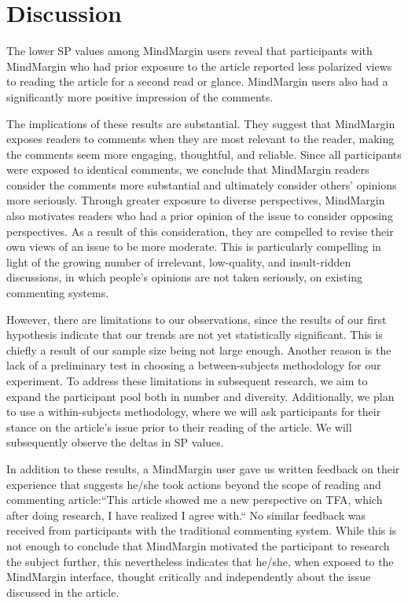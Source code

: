 \section{Discussion}

The lower SP values among MindMargin users reveal that participants with MindMargin who had prior exposure to the article reported less polarized views to reading the article for a second read or glance. MindMargin users also had a significantly more positive impression of the comments. 

The implications of these results are substantial. They suggest that MindMargin exposes readers to comments when they are most relevant to the reader, making the comments seem more engaging, thoughtful, and reliable. Since all participants were exposed to identical comments, we conclude that MindMargin readers consider the comments more substantial and ultimately consider others' opinions more seriously. Through greater exposure to diverse perspectives, MindMargin also motivates readers who had a prior opinion of the issue to consider opposing perspectives. As a result of this consideration, they are compelled to revise their own views of an issue to be more moderate. This is particularly compelling in light of the growing number of irrelevant, low-quality, and insult-ridden discussions, in which people's opinions are not taken seriously, on existing commenting systems.

However, there are limitations to our observations, since the results of our first hypothesis indicate that our trends are not yet statistically significant. This is chiefly a result of our sample size being not large enough. Another reason is the lack of a preliminary test in choosing a between-subjects methodology for our experiment. To address these limitations in subsequent research, we aim to expand the participant pool both in number and diversity. Additionally, we plan to use a within-subjects methodology, where we will ask participants for their stance on the article's issue prior to their reading of the article. We will subsequently observe the deltas in SP values.

In addition to these results, a MindMargin user gave us written feedback on their experience that suggests he/she took actions beyond the scope of reading and commenting article:``This article showed me a new perspective on TFA, which after doing research, I have realized I agree with.`` No similar feedback was received from participants with the traditional commenting system. While this is not enough to conclude that MindMargin motivated the participant to research the subject further, this nevertheless indicates that he/she, when exposed to the MindMargin interface, thought critically and independently about the issue discussed in the article.